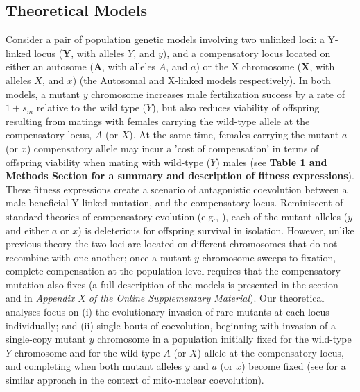 \documentclass{article}
\begin{document}
\subsection{Theoretical Models} \label{subsec:ModelRes}

Consider a pair of population genetic models involving two unlinked loci: a Y-linked locus ($\mathbf{Y}$, with alleles $Y$, and $y$), and a compensatory locus located on either an autosome ($\mathbf{A}$, with alleles $A$, and $a$) or the X chromosome ($\mathbf{X}$, with alleles $X$, and $x$) (the Autosomal and X-linked models respectively). In both models, a mutant $y$ chromosome increases male fertilization success by a rate of $1 + s_m$ relative to the wild type ($Y$), but also reduces viability of offspring resulting from matings with females carrying the wild-type allele at the compensatory locus, $A$ (or $X$). At the same time, females carrying the mutant $a$ (or $x$) compensatory allele may incur a 'cost of compensation' in terms of offspring viability when mating with wild-type ($Y$) males (see {\bf Table 1 and Methods Section for a summary and description of fitness expressions}). These fitness expressions create a scenario of antagonistic coevolution between a male-beneficial Y-linked mutation, and the compensatory locus. Reminiscent of standard theories of compensatory evolution (e.g., \citealt{Kimura1985,Stephan1996,WeinreichChao2005}), each of the mutant alleles ($y$ and either $a$ or $x$) is deleterious for offspring survival in isolation. However, unlike previous theory the two loci are located on different chromosomes that do not recombine with one another; once a mutant $y$ chromosome sweeps to fixation, complete compensation at the population level requires that the compensatory mutation also fixes (a full description of the models is presented in the  section and in {\itshape Appendix X of the Online Supplementary Material}). Our theoretical analyses focus on (i) the evolutionary invasion of rare mutants at each locus individually; and (ii) single bouts of coevolution, beginning with invasion of a single-copy mutant $y$ chromosome in a population initially fixed for the wild-type $Y$ chromosome and for the wild-type $A$ (or $X$) allele at the compensatory locus, and completing when both mutant alleles $y$ and $a$ (or $x$) become fixed (see \citealt{ConnallonDowling2017} for a similar approach in the context of mito-nuclear coevolution). 
\end{document}
